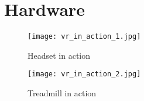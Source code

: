 \newpage
\section{Hardware}
\label{sec:hardware}

\begin{figure}
  \texttt{[image: vr\_in\_action\_1.jpg]}
  \caption{Headset in action}
\end{figure}
\begin{figure}
  \texttt{[image: vr\_in\_action\_2.jpg]}
  \caption{Treadmill in action}
\end{figure}